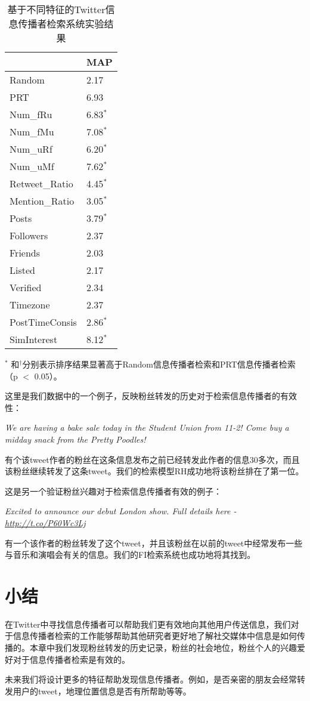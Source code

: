 \begin{table}[!htbp]
 \centering
  \caption{基于不同特征的Twitter信息传播者检索系统实验结果}
 \label{Retweeter_alone}
 \begin{tabular}{|l l|}
 \hline
 & MAP \\
 \hline
Random & 2.17\\
PRT &6.93\\
 \hline
Num\_fRu &6.83$^\ast$\\
Num\_fMu &7.08$^\ast$\\
Num\_uRf&6.20$^\ast$\\
Num\_uMf&7.62$^\ast$\\
Retweet\_Ratio&4.45$^\ast$\\
Mention\_Ratio&3.05$^\ast$\\
 \hline
Posts&3.79$^\ast$\\
Followers&2.37\\
Friends&2.03\\
Listed&2.17\\
Verified&2.34\\
 \hline
Timezone&2.37\\
PostTimeConsis&2.86$^\ast$\\
 \hline
SimInterest& 8.12$^\ast$\\
 \hline
 \end{tabular}
   \begin{tablenotes}
        \footnotesize
\item $^\ast$ 和$^\dagger$分别表示排序结果显著高于Random信息传播者检索和PRT信息传播者检索（p $<$ 0.05）。
\end{tablenotes}
\end{table}

这里是我们数据中的一个例子，反映粉丝转发的历史对于检索信息传播者的有效性：
\begin{description}
\item{} \emph{We are having a bake sale today in the Student Union from 11-2! Come buy a midday snack from the Pretty 
Poodles!}
\end{description}
有个该tweet作者的粉丝在这条信息发布之前已经转发此作者的信息30多次，而且该粉丝继续转发了这条tweet。我们的检索模型RH成功地将该粉丝排在了第一位。

这是另一个验证粉丝兴趣对于检索信息传播者有效的例子：
\begin{description}
\item{} \emph{Excited to announce our debut London show. Full details here - \url{http://t.co/P60Wc3Lj}}
\end{description}
有一个该作者的粉丝转发了这个tweet，并且该粉丝在以前的tweet中经常发布一些与音乐和演唱会有关的信息。我们的FI检索系统也成功地将其找到。

\section{小结}
在Twitter中寻找信息传播者可以帮助我们更有效地向其他用户传送信息，我们对于信息传播者检索的工作能够帮助其他研究者更好地了解社交媒体中信息是如何传播的。本章中我们发现粉丝转发的历史记录，粉丝的社会地位，粉丝个人的兴趣爱好对于信息传播者检索是有效的。

未来我们将设计更多的特征帮助发现信息传播者。例如，是否亲密的朋友会经常转发用户的tweet，地理位置信息是否有所帮助等等。





